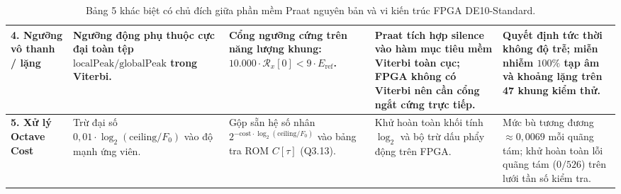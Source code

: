 \documentclass[11pt,a4paper]{article}
\begin{document}
\begin{table}[H]
{\begin{tabular}{@{}p{3.2cm}p{4.2cm}p{4.2cm}p{3.6cm}p{3.8cm}@{}}
\textbf{4. Ngưỡng vô thanh / lặng} & Ngưỡng động phụ thuộc cực đại toàn tệp $\text{localPeak}/\text{globalPeak}$ trong Viterbi. & Cổng ngưỡng cứng trên năng lượng khung: $10.000 \cdot \mathcal{R}_x[0] < 9 \cdot E_{\text{ref}}$. & Praat tích hợp silence vào hàm mục tiêu mềm Viterbi toàn cục; FPGA không có Viterbi nên cần cổng ngắt cứng trực tiếp. & Quyết định tức thời không độ trễ; miễn nhiễm $100\%$ tạp âm và khoảng lặng trên 47 khung kiểm thử. \\ \midrule
\textbf{5. Xử lý Octave Cost} & Trừ đại số $0{,}01 \cdot \log_2(\text{ceiling}/F_0)$ vào độ mạnh ứng viên. & Gộp sẵn hệ số nhân $2^{-\text{cost} \cdot \log_2(\text{ceiling}/F_0)}$ vào bảng tra ROM $C[\tau]$ (Q3.13). & Khử hoàn toàn khối tính $\log_2$ và bộ trừ dấu phẩy động trên FPGA. & Mức bù tương đương $\approx 0{,}0069$ mỗi quãng tám; khử hoàn toàn lỗi quãng tám ($0/526$) trên lưới tần số kiểm tra. \\ \bottomrule
\end{tabular}%
}
\caption{Bảng 5 khác biệt có chủ đích giữa phần mềm Praat nguyên bản và vi kiến trúc FPGA DE10-Standard.}
\label{tab:praat_fpga_diff}
\end{table}
\end{document}
